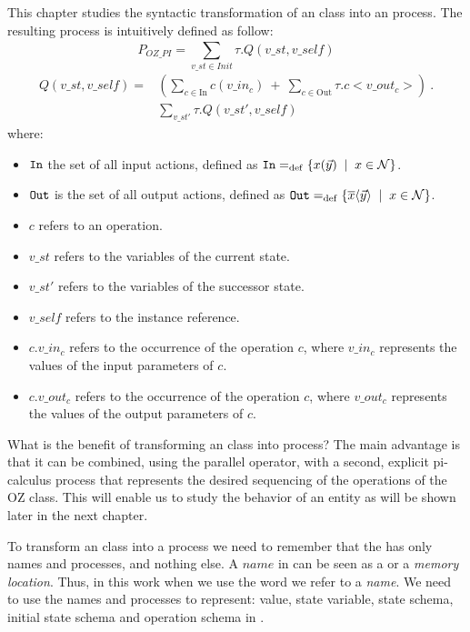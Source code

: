 This chapter studies the syntactic transformation of an \oz{} class into an \picalc{} process. The resulting process is intuitively defined as follow:
\[P_{OZ\_PI} = \sum_{v\_st\in Init}^{} \tau. Q(v\_st,v\_self)\]
\begin{equation*}
\begin{aligned}
Q(v\_st,v\_self) ={} & (\sum_{c\in \text{In}}^{} c(v\_in_{c}) \ +\ \sum_{c\in \text{Out}}^{} \tau.c<v\_out_{c}>)\ . \\
      &  \sum_{v\_st'}^{} \tau.Q(v\_st',v\_self)
\end{aligned}
\end{equation*}
where:
\begin{itemize}
\item $\mathtt{In}$ the set of all input actions, defined as $\inA\define\set[x\in\names]{\inp{x}{\vec{y}}}$.
\item $\mathtt{Out}$ is the set of all output actions, defined as $\outA\define\set[x\in\names]{\out{x}{\vec{y}}}$.
\item $c$ refers to an operation.
\item $v\_st$ refers to the variables of the current state.
\item $v\_st'$ refers to the variables of the successor state.
\item $v\_self$ refers to the instance reference.
\item $c.v\_in_{c}$ refers to the occurrence of the operation $c$, where $v\_in_{c}$ represents the values of the input parameters of $c$.
\item $c.v\_out_{c}$ refers to the occurrence of the operation $c$, where $v\_out_{c}$ represents the values of the output parameters of $c$.
\end{itemize}

What is the benefit of transforming an \oz{} class into \picalc{} process? The main advantage is that it can be combined, using the
parallel operator, with a second, explicit pi-calculus
process that represents the desired sequencing of the operations
of the OZ class. This will enable us to study the behavior of an entity as will be shown later in the next chapter.

To transform an \oz{} class into a \picalc{} process we need to remember that the \picalc{} has only names and processes, and nothing else. A $name$ in \picalc{} can be seen as a  or a \textit{memory location}. Thus, in this work when we use the word  we refer to a \picalc{} \textit{name}. We need to use the names and processes to represent: value, state variable, state schema, initial state schema and operation schema in \picalc{}.

